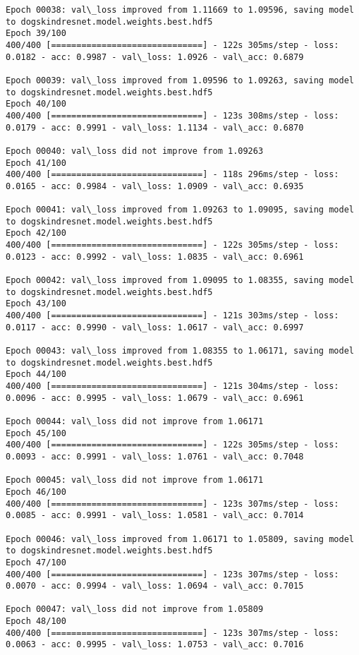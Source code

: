\documentclass[11pt]{article}
\begin{document}
\begin{Verbatim}[commandchars=\\\{\}]
Epoch 00038: val\_loss improved from 1.11669 to 1.09596, saving model to dogskindresnet.model.weights.best.hdf5
Epoch 39/100
400/400 [==============================] - 122s 305ms/step - loss: 0.0182 - acc: 0.9987 - val\_loss: 1.0926 - val\_acc: 0.6879

Epoch 00039: val\_loss improved from 1.09596 to 1.09263, saving model to dogskindresnet.model.weights.best.hdf5
Epoch 40/100
400/400 [==============================] - 123s 308ms/step - loss: 0.0179 - acc: 0.9991 - val\_loss: 1.1134 - val\_acc: 0.6870

Epoch 00040: val\_loss did not improve from 1.09263
Epoch 41/100
400/400 [==============================] - 118s 296ms/step - loss: 0.0165 - acc: 0.9984 - val\_loss: 1.0909 - val\_acc: 0.6935

Epoch 00041: val\_loss improved from 1.09263 to 1.09095, saving model to dogskindresnet.model.weights.best.hdf5
Epoch 42/100
400/400 [==============================] - 122s 305ms/step - loss: 0.0123 - acc: 0.9992 - val\_loss: 1.0835 - val\_acc: 0.6961

Epoch 00042: val\_loss improved from 1.09095 to 1.08355, saving model to dogskindresnet.model.weights.best.hdf5
Epoch 43/100
400/400 [==============================] - 121s 303ms/step - loss: 0.0117 - acc: 0.9990 - val\_loss: 1.0617 - val\_acc: 0.6997

Epoch 00043: val\_loss improved from 1.08355 to 1.06171, saving model to dogskindresnet.model.weights.best.hdf5
Epoch 44/100
400/400 [==============================] - 121s 304ms/step - loss: 0.0096 - acc: 0.9995 - val\_loss: 1.0679 - val\_acc: 0.6961

Epoch 00044: val\_loss did not improve from 1.06171
Epoch 45/100
400/400 [==============================] - 122s 305ms/step - loss: 0.0093 - acc: 0.9991 - val\_loss: 1.0761 - val\_acc: 0.7048

Epoch 00045: val\_loss did not improve from 1.06171
Epoch 46/100
400/400 [==============================] - 123s 307ms/step - loss: 0.0085 - acc: 0.9991 - val\_loss: 1.0581 - val\_acc: 0.7014

Epoch 00046: val\_loss improved from 1.06171 to 1.05809, saving model to dogskindresnet.model.weights.best.hdf5
Epoch 47/100
400/400 [==============================] - 123s 307ms/step - loss: 0.0070 - acc: 0.9994 - val\_loss: 1.0694 - val\_acc: 0.7015

Epoch 00047: val\_loss did not improve from 1.05809
Epoch 48/100
400/400 [==============================] - 123s 307ms/step - loss: 0.0063 - acc: 0.9995 - val\_loss: 1.0753 - val\_acc: 0.7016


\end{Verbatim}
\end{document}
